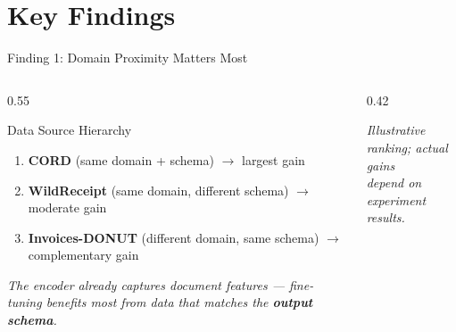 \documentclass[aspectratio=169,11pt]{beamer}
\begin{document}
\section{Key Findings}

\begin{frame}{Finding 1: Domain Proximity Matters Most}
  \begin{columns}[T]
    \begin{column}{0.55\textwidth}
      \begin{block}{Data Source Hierarchy}
        \begin{enumerate}
          \item \textbf{CORD} (same domain + schema)
                $\to$ largest gain
          \item \textbf{WildReceipt} (same domain, different schema)
                $\to$ moderate gain
          \item \textbf{Invoices-DONUT} (different domain, same schema)
                $\to$ complementary gain
        \end{enumerate}
      \end{block}

      \vspace{0.3cm}

      \textit{The encoder already captures document features ---
      fine-tuning benefits most from data that matches the
      \textbf{output schema}.}
    \end{column}
    \begin{column}{0.42\textwidth}
      \centering
      {\tiny\textit{Illustrative ranking; actual gains\\depend on experiment results.}}
    \end{column}
  \end{columns}
\end{frame}
\end{document}
